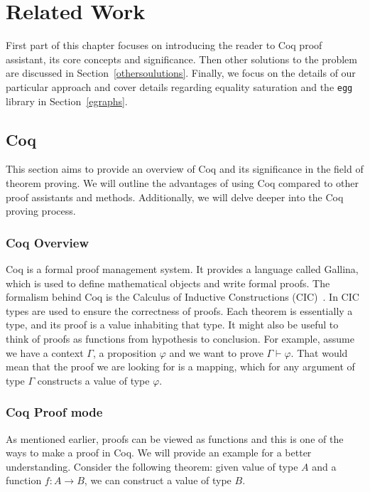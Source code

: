 \section{Related Work}
First part of this chapter focuses on introducing the reader to Coq proof assistant, its core concepts and significance. Then other solutions to the problem are discussed in Section~\ref{othersoulutions}. Finally, we focus on the details of our particular approach and cover details regarding equality saturation and the \texttt{egg} library in Section~\ref{egraphs}.

\subsection{Coq}\label{relatedworkcoq}
This section aims to provide an overview of Coq and its significance in the field of theorem proving. We will outline the advantages of using Coq compared to other proof assistants and methods. Additionally, we will delve deeper into the Coq proving process.

\subsubsection{Coq Overview}
Coq is a formal proof management system. It provides a language called Gallina, which is used to define mathematical objects and write formal proofs. The formalism behind Coq is the Calculus of Inductive Constructions (CIC)~\cite{paulinmohring:hal-01094195}. In CIC types are used to ensure the correctness of proofs. Each theorem is essentially a type, and its proof is a value inhabiting that type. It might also be useful to think of proofs as functions from hypothesis to conclusion. For example, assume we have a context $\Gamma$, a proposition $\varphi$ and we want to prove $\Gamma \vdash \varphi$. That would mean that the proof we are looking for is a mapping, which for any argument of type $\Gamma$ constructs a value of type $\varphi$. 

\subsubsection{Coq Proof mode}
As mentioned earlier, proofs can be viewed as functions and this is one of the ways to make a proof in Coq. We will provide an example for a better understanding. Consider the following theorem: given value of type $A$ and a function $f : A \to B$, we can construct a value of type $B$. 

